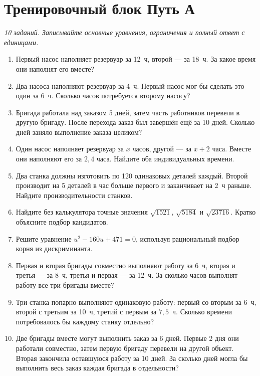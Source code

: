 \documentclass[a4paper,12pt]{article}
\begin{document}
\section*{Тренировочный блок \hfill Путь А}
\textit{10 заданий. Записывайте основные уравнения, ограничения и полный ответ с единицами.}
\begin{enumerate}
\item Первый насос наполняет резервуар за 12~ч, второй --- за 18~ч. За какое время они наполнят его вместе?
\item Два насоса наполняют резервуар за 4~ч. Первый насос мог бы сделать это один за 6~ч. Сколько часов потребуется второму насосу?
\item Бригада работала над заказом 5 дней, затем часть работников перевели в другую бригаду. После перехода заказ был завершён ещё за 10 дней. Сколько дней заняло выполнение заказа целиком?
\item Один насос наполняет резервуар за \(x\) часов, другой --- за \(x+2\) часа. Вместе они наполняют его за \(2{,}4\) часа. Найдите оба индивидуальных времени.
\item Два станка должны изготовить по 120 одинаковых деталей каждый. Второй производит на 5 деталей в час больше первого и заканчивает на 2~ч раньше. Найдите производительности станков.
\item Найдите без калькулятора точные значения \(\sqrt{1521}\), \(\sqrt{5184}\) и \(\sqrt{23716}\). Кратко объясните подбор кандидатов.
\item Решите уравнение \(u^2-160u+471=0\), используя рациональный подбор корня из дискриминанта.
\item Первая и вторая бригады совместно выполняют работу за 6~ч, вторая и третья --- за 8~ч, третья и первая --- за 12~ч. За сколько часов выполнят работу все три бригады вместе?
\item Три станка попарно выполняют одинаковую работу: первый со вторым за 6~ч, второй с третьим за 10~ч, третий с первым за \(7{,}5\)~ч. Сколько времени потребовалось бы каждому станку отдельно?
\item Две бригады вместе могут выполнить заказ за 6 дней. Первые 2 дня они работали совместно, затем первую бригаду перевели на другой объект. Вторая закончила оставшуюся работу за 10 дней. За сколько дней могла бы выполнить весь заказ каждая бригада в отдельности?
\end{enumerate}

\clearpage
\end{document}
